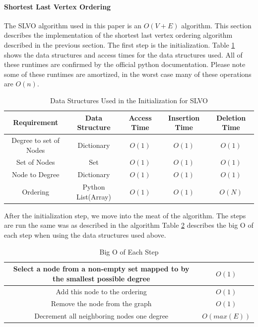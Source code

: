 \documentclass{article}
\begin{document}
    \paragraph{Shortest Last Vertex Ordering}
    The SLVO algorithm used in this paper is an $O(V+E)$ algorithm.
    This section describes the implementation of the shortest last vertex ordering algorithm described in the previous section.
    The first step is the initialization.
    Table \ref{used_structures_slvo} shows the data structures and access times for the data structures used.
    All of these runtimes are confirmed by the official python documentation\cite{pythonwikiruntimes}.
    Please note some of these runtimes are amortized, in the worst case many of these operations are $O(n)$.

    \begin{table}
      \centering
      \label{used_structures_slvo}
      \begin{adjustbox}{width=1\textwidth}
        \begin{tabular}{ |c|c|c|c|c| }
          \hline
          Requirement & Data Structure & Access Time & Insertion Time & Deletion Time \\
          \hline
          Degree to set of Nodes & Dictionary & $O(1)$ & $O(1)$ & $O(1)$ \\
          \hline
          Set of Nodes & Set & $O(1)$ & $O(1)$ & $O(1)$ \\
          \hline
          Node to Degree & Dictionary & $O(1)$ & $O(1)$ & $O(1)$ \\
          \hline
          Ordering & Python List(Array) & $O(1)$ & $O(1)$ & $O(N)$ \\
          \hline
        \end{tabular}
      \end{adjustbox}
      \caption{Data Structures Used in the Initialization for SLVO}
    \end{table}

    After the initialization step, we move into the meat of the algorithm.
    The steps are run the same was as described in the algorithm
    Table \ref{big_o_slvo} describes the big O of each step when using the data structures used above.

    \begin{table}
      \centering
      \label{big_o_slvo}
      \begin{adjustbox}{width=1\textwidth}
        \begin{tabular}{ |c|c| }
          \hline
          Select a node from a non-empty set mapped to by the smallest possible degree & $O(1)$ \\
          \hline
          Add this node to the ordering & $O(1)$ \\
          \hline
          Remove the node from the graph & $O(1)$ \\
          \hline
          Decrement all neighboring nodes one degree & $O(max(E))$ \\
          \hline
        \end{tabular}
      \end{adjustbox}
      \caption{Big O of Each Step}
    \end{table}
\end{document}
